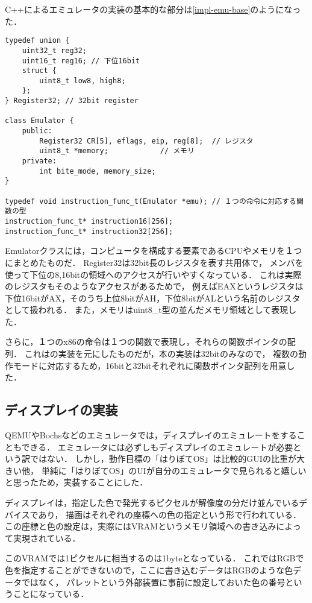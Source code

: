 \documentclass[10pt,a4j]{jsarticle}
\begin{document}
C++によるエミュレータの実装の基本的な部分は\ref{impl-emu-base}のようになった．
\begin{lstlisting}[caption=エミュレータの基本的な実装,label=impl-emu-base]
typedef union {
	uint32_t reg32;
	uint16_t reg16; // 下位16bit
	struct {
		uint8_t low8, high8;
	};
} Register32; // 32bit register

class Emulator {
	public:
		Register32 CR[5], eflags, eip, reg[8];	// レジスタ
		uint8_t *memory;			// メモリ
	private:
		int bite_mode, memory_size;
}

typedef void instruction_func_t(Emulator *emu); // １つの命令に対応する関数の型
instruction_func_t* instruction16[256];
instruction_func_t* instruction32[256];
\end{lstlisting}
Emulatorクラスには，コンピュータを構成する要素であるCPUやメモリを１つにまとめたものだ．
Register32は32bit長のレジスタを表す共用体で，
メンバを使って下位の8,16bitの領域へのアクセスが行いやすくなっている．
これは実際のレジスタもそのようなアクセスがあるためで，
例えばEAXというレジスタは下位16bitがAX，そのうち上位8bitがAH，下位8bitがALという名前のレジスタとして扱われる．
また，メモリはuint8\_t型の並んだメモリ領域として表現した．

さらに，１つのx86の命令は１つの関数で表現し，それらの関数ポインタの配列．
これは\cite{learn-x86-by-emu}の実装を元にしたものだが，本の実装は32bitのみなので，
複数の動作モードに対応するため，16bitと32bitそれぞれに関数ポインタ配列を用意した．

\subsection{ディスプレイの実装}
QEMUやBochsなどのエミュレータでは，ディスプレイのエミュレートをすることもできる．
エミュレータには必ずしもディスプレイのエミュレートが必要という訳ではない．
しかし，動作目標の「はりぼてOS」は比較的GUIの比重が大きい他，
単純に「はりぼてOS」のUIが自分のエミュレータで見られると嬉しいと思ったため，実装することにした．

ディスプレイは，指定した色で発光するピクセルが解像度の分だけ並んでいるデバイスであり，
描画はそれぞれの座標への色の指定という形で行われている．
この座標と色の設定は，実際にはVRAMというメモリ領域への書き込みによって実現されている．

このVRAMでは1ピクセルに相当するのは1byteとなっている．
これではRGBで色を指定することができないので，ここに書き込むデータはRGBのような色データではなく，
パレットという外部装置に事前に設定しておいた色の番号ということになっている．
\end{document}

